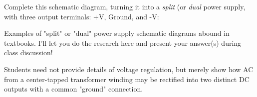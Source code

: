 

Complete this schematic diagram, turning it into a {\it split} (or {\it dual} power supply, with three output terminals: +V, Ground, and -V:

\vskip 10pt



\vskip 10pt







Examples of "split" or "dual" power supply schematic diagrams abound in textbooks.  I'll let you do the research here and present your answer(s) during class discussion!







Students need not provide details of voltage regulation, but merely show how AC from a center-tapped transformer winding may be rectified into two distinct DC outputs with a common "ground" connection.




